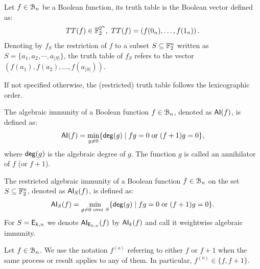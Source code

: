 \documentclass[11pt]{llncs}
\begin{document}
\begin{definition}\label{def:trutthTable}
	Let $f\in \mathcal{B}_{n}$ be a Boolean function, its truth table is the Boolean vector defined as:
\begin{align*}
TT(f) \in \mathbb{F}_2^{2^n},\  TT(f) = \left(f(0_n), \dots, f(1_n)\right).
\end{align*}	
	Denoting by $f_S$ the restriction of $f$ to a subset $S\subseteq \mathbb{F}_2^n$ written as $S = \{a_1, a_2, \cdots, a_{|S|}\}$, the truth table of $f_S$ refers to the vector $\left(f(a_1), f(a_2), \dots, f(a_{|S|})\right)$.

If not specified otherwise, the (restricted) truth table follows the lexicographic order.	
		
\end{definition}




\begin{definition} \label{def:ai}
	The algebraic immunity of a Boolean function $f\in \mathcal{B}_{n}$, denoted as $\mathsf{AI}(f)$, is defined as:
	\[ \mathsf{AI}(f) = \min_{g \neq 0}\{ \mathsf{deg}(g) \; | \; fg = 0 \; \text{or} \; (f + 1)g = 0 \}{,} \]
	where $\mathsf{deg}(g)$ is the algebraic degree of $g$.
	The function $g$ is called an annihilator of $f$ (or $f + 1$). 
	
The restricted algebraic immunity of a Boolean function $f\in \mathcal{B}_{n}$ on the set $S\subseteq \mathbb{F}_2^n$, denoted as $\mathsf{AI}_S(f)$, is defined as:
\[ \mathsf{AI}_S(f) = \min_{g \neq 0 \text{ over } S}\{ \mathsf{deg}(g) \; | \; fg = 0 \; \text{or} \; (f + 1)g = 0 \}{.} \]	
For $S=\mathsf{E}_{k,n}$ we denote $\mathsf{AI}_{\mathsf{E}_{k,n}}(f)$ by $\mathsf{AI}_{k}(f)$ and call it weightwise algebraic immunity.
	
	
\end{definition}

\begin{remark}
    Let $f\in \mathcal{B}_{n}$. We use the notation $f^{(o)}$ referring to either $f$ or $f + 1$ when the same process or result applies to any of them. 
    In particular, $f^{(o)} \in \{f, f + 1\}$.
\end{remark}
\end{document}
